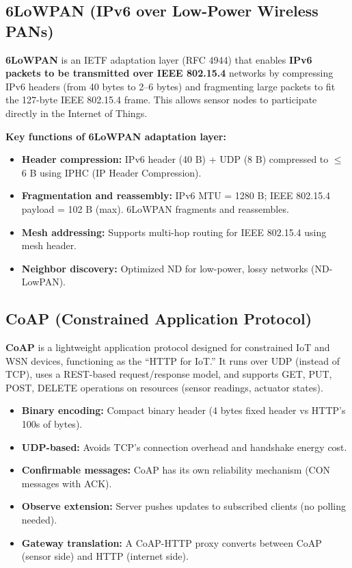 \documentclass[12pt,a4paper]{article}
\begin{document}
\subsection{6LoWPAN (IPv6 over Low-Power Wireless PANs)}

\begin{tcolorbox}[defbox, title={\textbf{6LoWPAN --- Definition}}]
\textbf{6LoWPAN} is an IETF adaptation layer (RFC 4944) that enables \textbf{IPv6 packets to be transmitted over IEEE 802.15.4} networks by compressing IPv6 headers (from 40 bytes to 2--6 bytes) and fragmenting large packets to fit the 127-byte IEEE 802.15.4 frame. This allows sensor nodes to participate directly in the Internet of Things.
\end{tcolorbox}

\textbf{Key functions of 6LoWPAN adaptation layer:}
\begin{itemize}[leftmargin=*, itemsep=3pt]
  \item \textbf{Header compression:} IPv6 header (40 B) + UDP (8 B) compressed to $\leq$ 6 B using IPHC (IP Header Compression).
  \item \textbf{Fragmentation and reassembly:} IPv6 MTU = 1280 B; IEEE 802.15.4 payload = 102 B (max). 6LoWPAN fragments and reassembles.
  \item \textbf{Mesh addressing:} Supports multi-hop routing for IEEE 802.15.4 using mesh header.
  \item \textbf{Neighbor discovery:} Optimized ND for low-power, lossy networks (ND-LowPAN).
\end{itemize}

\subsection{CoAP (Constrained Application Protocol)}

\begin{tcolorbox}[defbox, title={\textbf{CoAP --- Definition}}]
\textbf{CoAP} is a lightweight application protocol designed for constrained IoT and WSN devices, functioning as the ``HTTP for IoT.'' It runs over UDP (instead of TCP), uses a REST-based request/response model, and supports GET, PUT, POST, DELETE operations on resources (sensor readings, actuator states).
\end{tcolorbox}

\begin{itemize}[leftmargin=*, itemsep=3pt]
  \item \textbf{Binary encoding:} Compact binary header (4 bytes fixed header vs HTTP's 100s of bytes).
  \item \textbf{UDP-based:} Avoids TCP's connection overhead and handshake energy cost.
  \item \textbf{Confirmable messages:} CoAP has its own reliability mechanism (CON messages with ACK).
  \item \textbf{Observe extension:} Server pushes updates to subscribed clients (no polling needed).
  \item \textbf{Gateway translation:} A CoAP-HTTP proxy converts between CoAP (sensor side) and HTTP (internet side).
\end{itemize}
\end{document}
